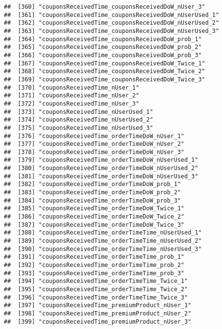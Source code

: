 \documentclass[10pt]{report}
\begin{document}
\begin{verbatim}
##  [360] "couponsReceivedTime_couponsReceivedDoW_nUser_3"       
##  [361] "couponsReceivedTime_couponsReceivedDoW_nUserUsed_1"   
##  [362] "couponsReceivedTime_couponsReceivedDoW_nUserUsed_2"   
##  [363] "couponsReceivedTime_couponsReceivedDoW_nUserUsed_3"   
##  [364] "couponsReceivedTime_couponsReceivedDoW_prob_1"        
##  [365] "couponsReceivedTime_couponsReceivedDoW_prob_2"        
##  [366] "couponsReceivedTime_couponsReceivedDoW_prob_3"        
##  [367] "couponsReceivedTime_couponsReceivedDoW_Twice_1"       
##  [368] "couponsReceivedTime_couponsReceivedDoW_Twice_2"       
##  [369] "couponsReceivedTime_couponsReceivedDoW_Twice_3"       
##  [370] "couponsReceivedTime_nUser_1"                          
##  [371] "couponsReceivedTime_nUser_2"                          
##  [372] "couponsReceivedTime_nUser_3"                          
##  [373] "couponsReceivedTime_nUserUsed_1"                      
##  [374] "couponsReceivedTime_nUserUsed_2"                      
##  [375] "couponsReceivedTime_nUserUsed_3"                      
##  [376] "couponsReceivedTime_orderTimeDoW_nUser_1"             
##  [377] "couponsReceivedTime_orderTimeDoW_nUser_2"             
##  [378] "couponsReceivedTime_orderTimeDoW_nUser_3"             
##  [379] "couponsReceivedTime_orderTimeDoW_nUserUsed_1"         
##  [380] "couponsReceivedTime_orderTimeDoW_nUserUsed_2"         
##  [381] "couponsReceivedTime_orderTimeDoW_nUserUsed_3"         
##  [382] "couponsReceivedTime_orderTimeDoW_prob_1"              
##  [383] "couponsReceivedTime_orderTimeDoW_prob_2"              
##  [384] "couponsReceivedTime_orderTimeDoW_prob_3"              
##  [385] "couponsReceivedTime_orderTimeDoW_Twice_1"             
##  [386] "couponsReceivedTime_orderTimeDoW_Twice_2"             
##  [387] "couponsReceivedTime_orderTimeDoW_Twice_3"             
##  [388] "couponsReceivedTime_orderTimeTime_nUserUsed_1"        
##  [389] "couponsReceivedTime_orderTimeTime_nUserUsed_2"        
##  [390] "couponsReceivedTime_orderTimeTime_nUserUsed_3"        
##  [391] "couponsReceivedTime_orderTimeTime_prob_1"             
##  [392] "couponsReceivedTime_orderTimeTime_prob_2"             
##  [393] "couponsReceivedTime_orderTimeTime_prob_3"             
##  [394] "couponsReceivedTime_orderTimeTime_Twice_1"            
##  [395] "couponsReceivedTime_orderTimeTime_Twice_2"            
##  [396] "couponsReceivedTime_orderTimeTime_Twice_3"            
##  [397] "couponsReceivedTime_premiumProduct_nUser_1"           
##  [398] "couponsReceivedTime_premiumProduct_nUser_2"           
##  [399] "couponsReceivedTime_premiumProduct_nUser_3"           

\end{verbatim}
\end{document}
